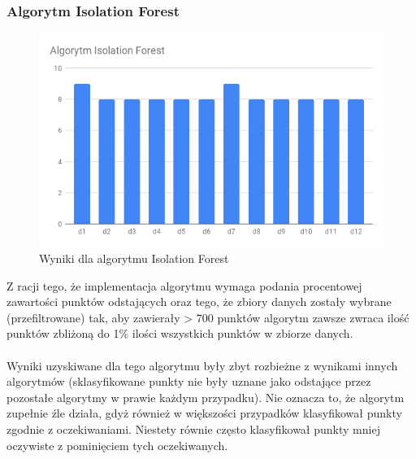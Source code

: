 \documentclass[eng,printmode]{mgr}
\begin{document}
\subsubsection{Algorytm Isolation Forest}
 \begin{figure}[H]
  \begin{center}
  \includegraphics[scale=0.7]{r_if}
  \end{center}
  \caption{Wyniki dla algorytmu Isolation Forest}
  \label{fig:r_if}
\end{figure}

Z racji tego, że implementacja algorytmu wymaga podania procentowej zawartości punktów odstających oraz tego, że zbiory danych zostały wybrane (przefiltrowane) tak, aby zawierały > 700 punktów algorytm zawsze zwraca ilość punktów zbliżoną do 1\% ilości wszystkich punktów w zbiorze danych.
\\\\
Wyniki uzyskiwane dla tego algorytmu były zbyt rozbieżne z wynikami innych algorytmów (sklasyfikowane punkty nie były uznane jako odstające przez pozostałe algorytmy w prawie każdym przypadku). Nie oznacza to, że algorytm zupełnie źle działa, gdyż również w większości przypadków klasyfikował punkty zgodnie z oczekiwaniami. Niestety równie często klasyfikował punkty mniej oczywiste z pominięciem tych oczekiwanych.
 
 
\end{document}
